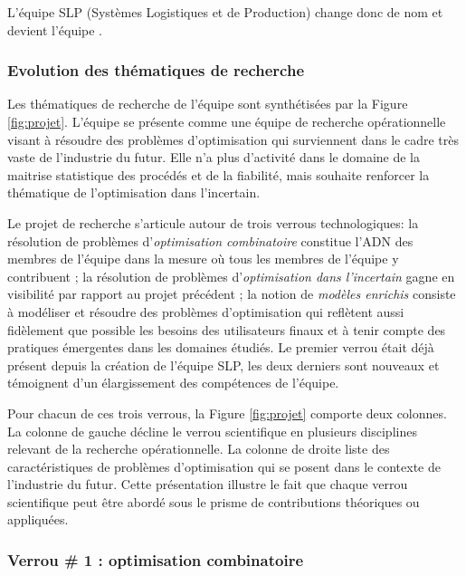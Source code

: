 		L'équipe SLP (Systèmes Logistiques et de Production) change donc de nom et devient l'équipe \slp. 
		
		
		
		\subsubsection{Evolution des thématiques de recherche}
		
		Les thématiques de recherche de l'équipe \slp sont synthétisées par la Figure \ref{fig:projet}. 
		L'équipe se présente comme une équipe de recherche opérationnelle visant à résoudre des problèmes d'optimisation qui surviennent dans le cadre très vaste de l'industrie du futur. Elle n'a plus d'activité dans le domaine de la maitrise statistique des procédés et de la fiabilité, mais souhaite renforcer la thématique de l'optimisation dans l'incertain.
		
		Le projet de recherche s'articule autour de trois verrous technologiques:  
	la résolution de problèmes d'\textit{optimisation combinatoire} constitue l'ADN des membres de l'équipe \slp dans la mesure où tous les membres de l'équipe y contribuent ; 
	la résolution de problèmes d'\textit{optimisation dans l'incertain} gagne en visibilité par rapport au projet précédent  ;
	la notion de \textit{modèles enrichis} consiste à modéliser et résoudre des problèmes d'optimisation qui reflètent aussi fidèlement que possible les besoins des utilisateurs finaux et à tenir compte des pratiques émergentes dans les domaines étudiés. Le premier verrou était déjà présent depuis la création de l'équipe SLP, les deux derniers sont nouveaux et témoignent d'un élargissement des compétences de l'équipe.
	
	Pour chacun de ces trois verrous, la Figure \ref{fig:projet} comporte deux colonnes. La colonne de gauche décline le verrou scientifique en plusieurs disciplines relevant de la recherche opérationnelle. La colonne de droite liste des caractéristiques de problèmes d'optimisation qui se posent dans le contexte de l'industrie du futur. Cette présentation illustre le fait que chaque verrou scientifique peut être abordé sous le prisme de contributions théoriques ou appliquées. 
	
	
	\subsubsection*{Verrou \# 1 : optimisation combinatoire}
	
